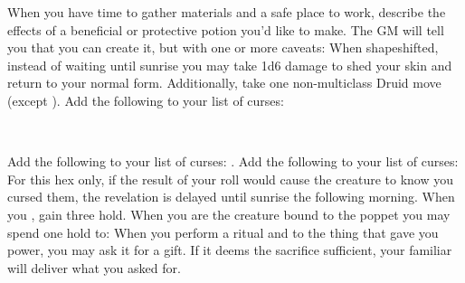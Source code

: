 \documentclass[darkmode]{dw_playbook}
\begin{document}
    {
            {When you have time to gather materials and a safe place to work, describe the effects of a beneficial or protective potion you’d like to make.  The GM will tell you that you can create it, but with one or more caveats:
            \gapSm
            \gapSm
            \gapSm
            \gapSm
            }
        \gap
            {
            When shapeshifted, instead of waiting until sunrise you may take 1d6 damage to shed your skin and return to your normal form.  Additionally, take one non-multiclass Druid move (except ).}
        \gap
            {Add the following to your list of curses:
            \gapSm
            }
    }

\clearpage
~

\pageThree
    {
        \advancedMovesCont
    }
    {
            {
            Add the following to your list of curses:
            \gapSm
            .
            \gapSm
            }
        \gap
            {Add the following to your list of curses:
            \gapSm
            \gapSm  
            For this hex only, if the result of your roll would cause the creature to know you cursed them, the revelation is delayed until sunrise the following morning.}
        \gap
            {
            When you , gain three hold.  When you are  the creature bound to the poppet you may spend one hold to:
            \gapSm
            \gapSm
            }
        \gap
            {When you perform a ritual and  to the thing that gave you power, you may ask it for a gift.  If it deems the sacrifice sufficient, your familiar will deliver what you asked for.}
    }
    {
        ~
    }
\end{document}
